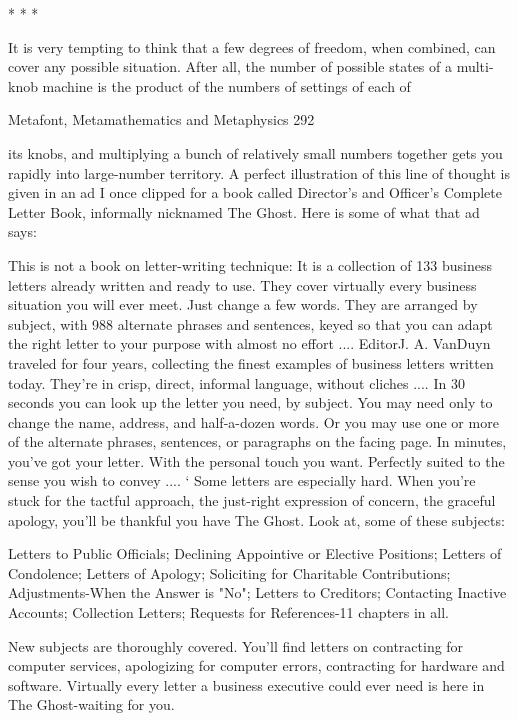                                           *   *   *

       It is very tempting to think that a few degrees of freedom, when combined, can
cover any possible situation. After all, the number of possible states of a multi-knob
machine is the product of the numbers of settings of each of




Metafont, Metamathematics and Metaphysics                                                 292

its knobs, and multiplying a bunch of relatively small numbers together gets you rapidly
into large-number territory. A perfect illustration of this line of thought is given in an ad I
once clipped for a book called Director's and Officer's Complete Letter Book, informally
nicknamed The Ghost. Here is some of what that ad says:

           This is not a book on letter-writing technique: It is a collection of 133
   business letters already written and ready to use. They cover virtually every
   business situation you will ever meet. Just change a few words. They are arranged
   by subject, with 988 alternate phrases and sentences, keyed so that you can adapt
   the right letter to your purpose with almost no effort .... EditorJ. A. VanDuyn
   traveled for four years, collecting the finest examples of business letters written
   today. They're in crisp, direct, informal language, without cliches .... In 30 seconds
   you can look up the letter you need, by subject. You may need only to change the
   name, address, and half-a-dozen words. Or you may use one or more of the
   alternate phrases, sentences, or paragraphs on the facing page. In minutes, you've
   got your letter. With the personal touch you want. Perfectly suited to the sense you
   wish to convey .... `
           Some letters are especially hard. When you're stuck for the tactful approach,
   the just-right expression of concern, the graceful apology, you'll be thankful you
   have The Ghost. Look at, some of these subjects:

      Letters to Public Officials; Declining Appointive or Elective Positions;
      Letters of Condolence; Letters of Apology; Soliciting for Charitable
      Contributions; Adjustments-When the Answer is "No"; Letters to Creditors;
      Contacting Inactive Accounts; Collection Letters; Requests for References-11
      chapters in all.

          New subjects are thoroughly covered. You'll find letters on contracting for
   computer services, apologizing for computer errors, contracting for hardware and
   software. Virtually every letter a business executive could ever need is here in The
   Ghost-waiting for you.


